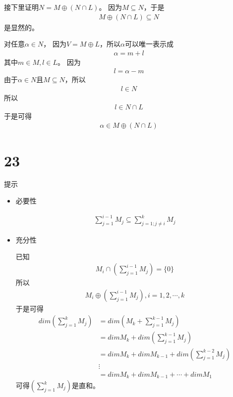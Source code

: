 \documentclass{article}
\begin{document}
接下里证明$N = M \oplus (N \cap L)$。
因为$M \subseteq N$，于是
\begin{align*}
  M \oplus (N \cap L) \subseteq N
\end{align*}
是显然的。

对任意$\alpha \in N$，
因为$V = M \oplus L$，所以$\alpha$可以唯一表示成
\begin{align*}
  \alpha = m + l
\end{align*}
其中$m \in M, l \in L$。
因为
\begin{align*}
  l = \alpha - m
\end{align*}
由于$\alpha \in N$且$M \subseteq N$，所以
\begin{align*}
  l \in N
\end{align*}
所以
\begin{align*}
  l \in N \cap L
\end{align*}
于是可得
\begin{align*}
  \alpha \in M \oplus (N \cap L)
\end{align*}

\section*{23}

提示
\begin{itemize}
  \item 必要性

        \begin{align*}
          \sum\limits_{j = 1}^{i - 1} M_j \subseteq \sum\limits_{j = 1; j \neq i}^{k} M_j
        \end{align*}

  \item 充分性

        已知
        \begin{align*}
          M_i \cap \left(\sum\limits_{j = 1}^{i - 1} M_j\right) = \{0\}
        \end{align*}
        所以
        \begin{align*}
          M_i \oplus \left(\sum\limits_{j = 1}^{i - 1} M_j\right), i = 1, 2, \cdots, k
        \end{align*}
        于是可得
        \begin{align*}
          dim \left(\sum\limits_{j = 1}^{k} M_j\right)
           & = dim \left(M_k + \sum\limits_{j = 1}^{k-1} M_j\right)                   \\
           & = dim M_k + dim \left(\sum\limits_{j = 1}^{k-1} M_j\right)               \\
           & = dim M_k + dim M_{k-1} + dim \left(\sum\limits_{j = 1}^{k-2} M_j\right) \\
           & \vdots                                                                   \\
           & = dim M_k + dim M_{k-1} + \cdots + dim M_1
        \end{align*}
        可得$\left(\sum\limits_{j = 1}^{k} M_j\right)$是直和。
\end{itemize}
\end{document}
